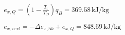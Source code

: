 \( e_{x,Q} = \left(1 - \frac{T_0}{T_B}\right) q_B = 369.58 \, \text{kJ/kg} \)  

\( e_{x,verl} = -\Delta e_{x,5k} + e_{x,Q} = 848.69 \, \text{kJ/kg} \)